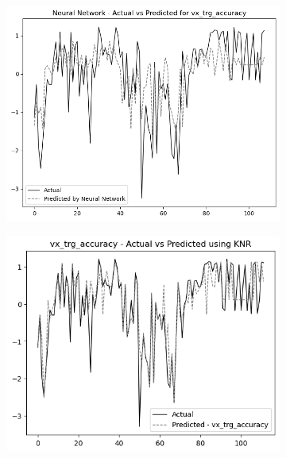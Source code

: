 \begin{figure}
    \begin{subfigure}[b]{0.49\textwidth}
        \centering
        \includegraphics[width=\linewidth]{images/nnCharts/all_data_visual_target_accuracy.png}
    \end{subfigure}\hfill
    \begin{subfigure}[b]{0.49\textwidth}
        \centering
        \includegraphics[width=\linewidth]{images/regressionCharts/all_data_visual_target_accuracy.png}
    \end{subfigure}
    

\end{figure}
